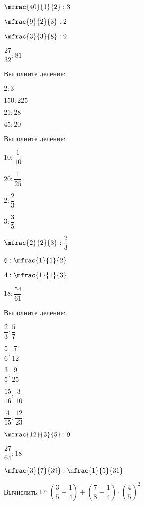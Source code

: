 \begin{class}[number=3]
\begin{listofex}
\begin{enumcols}[itemcolumns=4]
			\item \( \mfrac{40}{1}{2}:3 \)
			\item \( \mfrac{9}{2}{3}:2 \)
			\item \( \mfrac{3}{3}{8}:9 \)
			\item \( \dfrac{27}{32}:81 \)
		\end{enumcols}
		\item Выполните деление:
		\begin{enumcols}[itemcolumns=4]
			\item \( 2:3 \)
			\item \( 150:225 \)
			\item \( 21:28 \)
			\item \( 45:20 \)
		\end{enumcols}
		\item Выполните деление:
		\begin{enumcols}[itemcolumns=4]
			\item \( 10:\dfrac{1}{10} \)
			\item \( 20:\dfrac{1}{25} \)
			\item \( 2:\dfrac{2}{3} \)
			\item \( 3:\dfrac{3}{5} \)
			\item \( \mfrac{2}{2}{3}:\dfrac{2}{3} \)
			\item \( 6:\mfrac{1}{1}{2} \)
			\item \( 4:\mfrac{1}{1}{3} \)
			\item \( 18:\dfrac{54}{61} \)
		\end{enumcols}
		\item Выполните деление:
		\begin{enumcols}[itemcolumns=4]
			\item \( \dfrac{2}{3}:\dfrac{5}{7} \)
			\item \( \dfrac{5}{6}:\dfrac{7}{12} \)
			\item \( \dfrac{3}{5}:\dfrac{9}{25} \)
			\item \( \dfrac{15}{16}:\dfrac{3}{10} \)
			\item \( \dfrac{4}{15}:\dfrac{12}{23} \)
			\item \( \mfrac{12}{3}{5}:9 \)
			\item \( \dfrac{27}{64}:18 \)
			\item \( \mfrac{3}{7}{39}:\mfrac{1}{5}{31} \)
		\end{enumcols}
		\item Вычислить:\quad\( 17:\left( \dfrac{3}{5}+\dfrac{1}{4} \right)+\left( \dfrac{7}{8}-\dfrac{1}{4} \right)\cdot\left( \dfrac{4}{5} \right)^2 \)
	\end{listofex}
\end{class}
